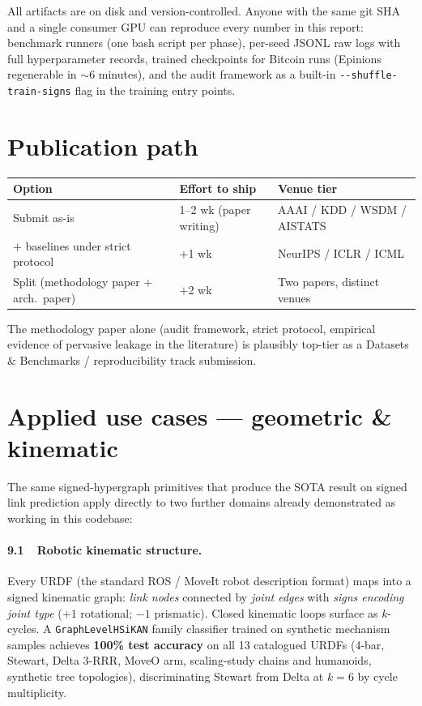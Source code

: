 \documentclass[11pt,a4paper]{article}
\begin{document}
All artifacts are on disk and version-controlled. Anyone with the
same git SHA and a single consumer GPU can reproduce every number
in this report: benchmark runners (one bash script per phase),
per-seed JSONL raw logs with full hyperparameter records, trained
checkpoints for Bitcoin runs (Epinions regenerable in $\sim$6
minutes), and the audit framework as a built-in
\verb|--shuffle-train-signs| flag in the training entry points.

\section{Publication path}

\begin{center}
\begin{tabular}{lll}
\toprule
\textbf{Option} & \textbf{Effort to ship} & \textbf{Venue tier} \\
\midrule
Submit as-is                              & 1--2 wk (paper writing) & AAAI / KDD / WSDM / AISTATS \\
$+$ baselines under strict protocol       & $+$1 wk                  & NeurIPS / ICLR / ICML \\
Split (methodology paper + arch.\ paper)  & $+$2 wk                  & Two papers, distinct venues \\
\bottomrule
\end{tabular}
\end{center}

The methodology paper alone (audit framework, strict protocol,
empirical evidence of pervasive leakage in the literature) is
plausibly top-tier as a Datasets \& Benchmarks / reproducibility
track submission.

\section{Applied use cases — geometric \& kinematic}

The same signed-hypergraph primitives that produce the SOTA result
on signed link prediction apply directly to two further domains
already demonstrated as working in this codebase:

\paragraph{9.1\ \ Robotic kinematic structure.} Every URDF (the
standard ROS / MoveIt robot description format) maps into a signed
kinematic graph: \emph{link nodes} connected by \emph{joint edges}
with \emph{signs encoding joint type} ($+1$ rotational; $-1$
prismatic). Closed kinematic loops surface as $k$-cycles. A
\verb|GraphLevelHSiKAN| family classifier trained on synthetic
mechanism samples achieves \textbf{100\% test accuracy} on all 13
catalogued URDFs (4-bar, Stewart, Delta 3-RRR, MoveO arm,
scaling-study chains and humanoids, synthetic tree topologies),
discriminating Stewart from Delta at $k{=}6$ by cycle multiplicity.
\end{document}
